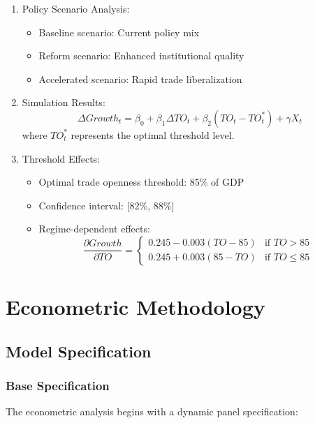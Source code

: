 \documentclass[12pt,a4paper]{article}
\theoremstyle{definition}
\begin{document}
\begin{enumerate}
    \item Policy Scenario Analysis:
    \begin{itemize}
        \item Baseline scenario: Current policy mix
        \item Reform scenario: Enhanced institutional quality
        \item Accelerated scenario: Rapid trade liberalization
    \end{itemize}

    \item Simulation Results:
    \begin{equation}
    \Delta Growth_t = \beta_0 + \beta_1 \Delta TO_t + \beta_2 (TO_t - TO_t^*) + \gamma X_t
    \end{equation}
    where $TO_t^*$ represents the optimal threshold level.

    \item Threshold Effects:
    \begin{itemize}
        \item Optimal trade openness threshold: 85\% of GDP
        \item Confidence interval: [82\%, 88\%]
        \item Regime-dependent effects:
        \begin{equation}
        \frac{\partial Growth}{\partial TO} = \begin{cases}
        0.245 - 0.003(TO - 85) & \text{if } TO > 85\\
        0.245 + 0.003(85 - TO) & \text{if } TO \leq 85
        \end{cases}
        \end{equation}
    \end{itemize}
\end{enumerate}

\section{Econometric Methodology}
\subsection{Model Specification}
\subsubsection{Base Specification}
The econometric analysis begins with a dynamic panel specification:
\end{document}

